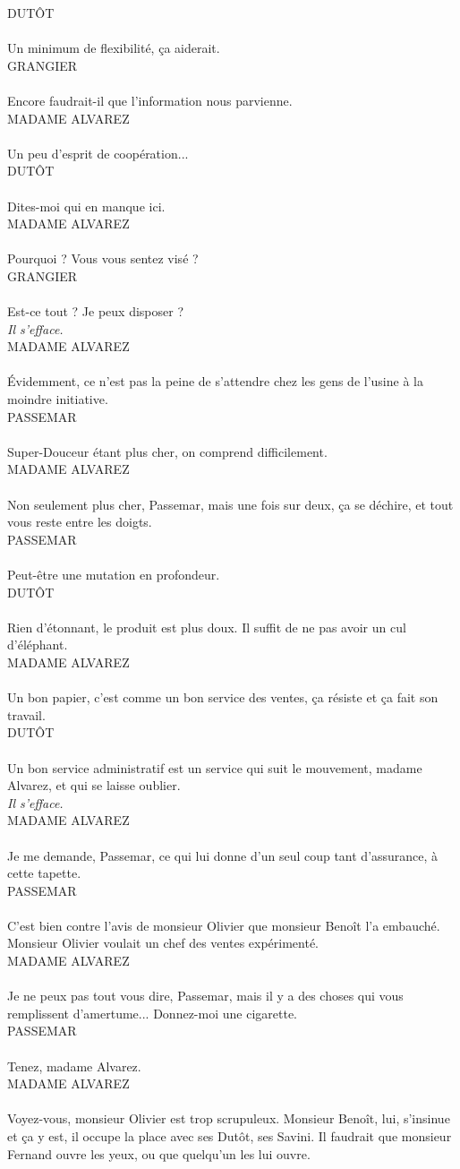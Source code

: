 \documentclass[a4paper]{report}
\newcounter{rem}[chapter]
\newcommand{\repl}[2]{\uppercase{#1}\\\\#2\\}
\newcommand{\didas}[1]{\textit{#1}\\}
\begin{document}
\repl{Dutôt}{Un minimum de flexibilité, ça aiderait.}

\repl{Grangier}{Encore faudrait-il que l'information nous parvienne.}

\repl{Madame Alvarez}{Un peu d'esprit de coopération...}

\repl{Dutôt}{Dites-moi qui en manque ici.}

\repl{Madame Alvarez}{Pourquoi ? Vous vous sentez visé ?}

\repl{Grangier}{Est-ce tout ? Je peux disposer ?}

\didas{Il s'efface.}

\repl{Madame Alvarez}{Évidemment, ce n'est pas la peine de s'attendre chez les gens de l'usine à la moindre initiative.}

\repl{Passemar}{Super-Douceur étant plus cher, on comprend difficilement.}

\repl{Madame Alvarez}{Non seulement plus cher, Passemar, mais une fois sur deux, ça se déchire, et tout vous reste entre les doigts.}

\repl{Passemar}{Peut-être une mutation en profondeur.}

\repl{Dutôt}{Rien d'étonnant, le produit est plus doux. Il suffit de ne pas avoir un cul d'éléphant.}

\repl{Madame Alvarez}{Un bon papier, c'est comme un bon service des ventes, ça résiste et ça fait son travail.}

\repl{Dutôt}{Un bon service administratif est un service qui suit le mouvement, madame Alvarez, et qui se laisse oublier.}

\didas{Il s'efface.}

\repl{Madame Alvarez}{Je me demande, Passemar, ce qui lui donne d'un seul coup tant d'assurance, à cette tapette.}

\repl{Passemar}{C'est bien contre l'avis de monsieur Olivier que monsieur Benoît l'a embauché. Monsieur Olivier voulait un chef des ventes expérimenté.}

\repl{Madame Alvarez}{Je ne peux pas tout vous dire, Passemar, mais il y a des choses qui vous remplissent d'amertume... Donnez-moi une cigarette.}

\repl{Passemar}{Tenez, madame Alvarez.}

\repl{Madame Alvarez}{Voyez-vous, monsieur Olivier est trop scrupuleux. Monsieur Benoît, lui, s'insinue et ça y est, il occupe la place avec ses Dutôt, ses Savini. Il faudrait que monsieur Fernand ouvre les yeux, ou que quelqu'un les lui ouvre.}
\end{document}

